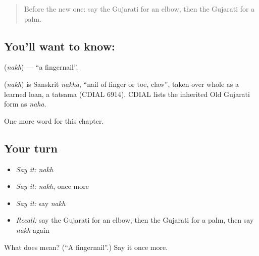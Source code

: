 \label{lesson:GU-C126-nakh}



\begin{quote}
Before the new one: say the Gujarati for an elbow, then the Gujarati for a palm.
\end{quote}

\subsection*{You'll want to know: }
\textbf{} (\emph{nakh}) — \textquotedblleft{}a fingernail\textquotedblright{}.

\begin{cousinweb}
\textbf{} (\emph{nakh}) is Sanskrit \emph{nakha}, \textquotedblleft{}nail of finger or toe, claw\textquotedblright{}, taken over whole as a learned loan, a tatsama (CDIAL 6914). CDIAL lists the inherited Old Gujarati form as \emph{naha}.
\end{cousinweb}

\begin{grammarlens}[title={What you've built}]
One more word for this chapter.
\end{grammarlens}

\subsection*{Your turn}
\begin{itemize}
\raggedright
  \item \emph{Say it:} \emph{nakh}
  \item \emph{Say it:} \emph{nakh}, once more
  \item \emph{Say it:} say \emph{nakh}
  \item \emph{Recall:} say the Gujarati for an elbow, then the Gujarati for a palm, then say \emph{nakh} again
\end{itemize}

\begin{tcolorbox}[breakable,colback=teal!4,colframe=teal!35!black,title={Before you move on}]
What does  mean? (\textquotedblleft{}A fingernail\textquotedblright{}.) Say it once more.
\end{tcolorbox}
